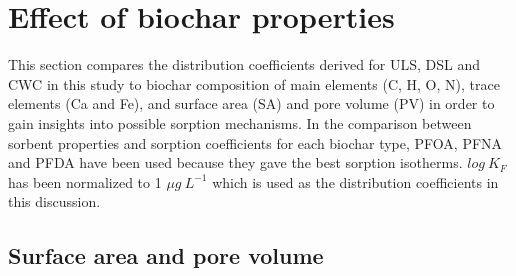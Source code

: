 
\section{Effect of biochar properties}
This section compares the distribution coefficients derived for ULS, DSL and CWC in this study to biochar composition of main elements (C, H, O, N), trace elements (Ca and Fe), and surface area (SA) and pore volume (PV) in order to gain insights into possible sorption mechanisms. In the comparison between sorbent properties and sorption coefficients for each biochar type, PFOA, PFNA and PFDA have been used because they gave the best sorption isotherms. $log~K_F$ has been normalized to 1 $\mu g~L^{-1}$ which is used as the distribution coefficients in this discussion.

\subsection{Surface area and pore volume}

